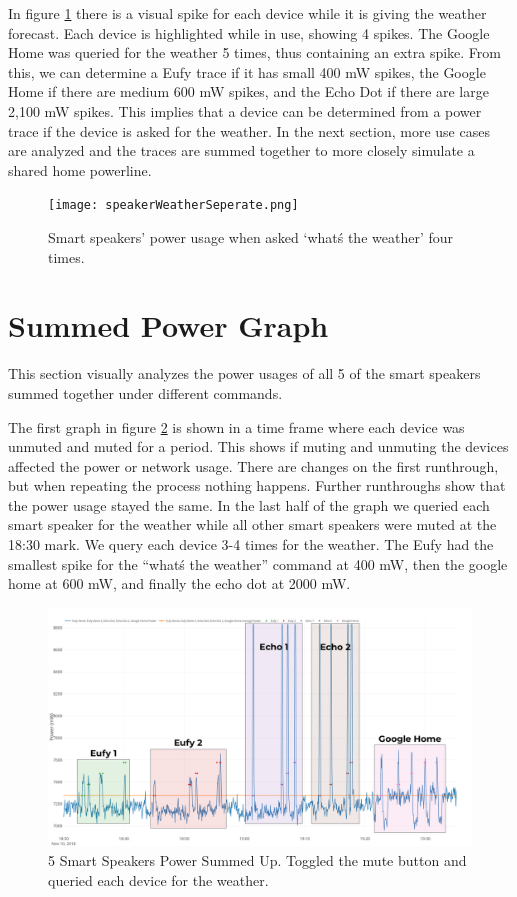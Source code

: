 In figure \ref{fig:speakerWeatherSeperate} there is a visual spike for each device while it is giving the weather forecast. Each device is highlighted while in use, showing 4 spikes. The Google Home was queried for the weather 5 times, thus containing an extra spike. From this, we can determine a Eufy trace if it has small 400 mW spikes, the Google Home if there are medium 600 mW spikes, and the Echo Dot if there are large 2,100 mW spikes. This implies that a device can be determined from a power trace if the device is asked for the weather. In the next section, more use cases are analyzed and the traces are summed together to more closely simulate a shared home powerline.

\begin{figure}[H]
    \centering
    \texttt{[image: speakerWeatherSeperate.png]}
    \caption{Smart speakers' power usage when asked `what\'s the weather' four times.}
    \label{fig:speakerWeatherSeperate}
\end{figure}

\section{Summed Power Graph}
\label{sumPowerGraph}
This section visually analyzes the power usages of all 5 of the smart speakers summed together under different commands.

The first graph in figure \ref{fig:weatherSum} is shown in a time frame where each device was unmuted and muted for a period. This shows if muting and unmuting the devices affected the power or network usage. There are changes on the first runthrough, but when repeating the process nothing happens. Further runthroughs show that the power usage stayed the same. In the last half of the graph we queried each smart speaker for the weather while all other smart speakers were muted at the 18:30 mark. We query each device 3-4 times for the weather. The Eufy had the smallest spike for the ``what\'s the weather'' command at 400 mW, then the google home at 600 mW, and finally the echo dot at 2000 mW.

\begin{figure}[H]
  \centering
  \includegraphics[width=1\textwidth]{figures/weatherSum.png}
  \caption{5 Smart Speakers Power Summed Up. Toggled the mute button and queried each device for the weather.}
  \label{fig:weatherSum}
\end{figure}

